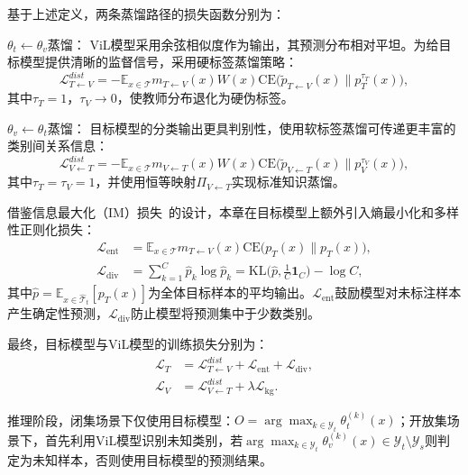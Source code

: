 基于上述定义，两条蒸馏路径的损失函数分别为：

$\theta_t\leftarrow\theta_v$蒸馏： ViL模型采用余弦相似度作为输出，其预测分布相对平坦。为给目标模型提供清晰的监督信号，采用硬标签蒸馏策略：
\begin{equation}
\mathcal{L}_{T\leftarrow V}^{dist} = -\mathbb{E}_{x\in\mathcal{T}}m_{T\leftarrow V}(x)W(x)\mathrm{CE}\big(\tilde{p}_{T\leftarrow V}(x) \| p_T^{\tau_T}(x)\big),
\label{eq:dist_t_from_v}
\end{equation}
其中$\tau_T=1$，$\tau_V\to 0$，使教师分布退化为硬伪标签。

$\theta_v\leftarrow\theta_t$蒸馏： 目标模型的分类输出更具判别性，使用软标签蒸馏可传递更丰富的类别间关系信息：
\begin{equation}
\mathcal{L}_{V\leftarrow T}^{dist} = -\mathbb{E}_{x\in\mathcal{T}}m_{V\leftarrow T}(x)W(x)\mathrm{CE}\big(\tilde{p}_{V\leftarrow T}(x) \| p_V^{\tau_V}(x)\big),
\label{eq:dist_v_from_t}
\end{equation}
其中$\tau_T=\tau_V=1$，并使用恒等映射$\Pi_{V\leftarrow T}$实现标准知识蒸馏。

借鉴信息最大化（IM）损失~\cite{liang2021source}的设计，本章在目标模型上额外引入熵最小化和多样性正则化损失：
\begin{align}
\mathcal{L}_{\text{ent}} & = \mathbb{E}_{x\in\mathcal{T}}m_{T\leftarrow V}(x)\mathrm{CE}\big(p_T(x) \| p_T(x)\big), 
\label{eq:loss_ent}\\
\mathcal{L}_{\text{div}} & = \sum_{k=1}^{C}\hat{p}_k\log\hat{p}_k = \mathrm{KL}\big(\hat{p},\tfrac{1}{C}\mathbf{1}_C\big) - \log C, 
\label{eq:loss_div}
\end{align}
其中$\hat{p}=\mathbb{E}_{x\in\hat{\mathcal{T}}_t}[p_T(x)]$为全体目标样本的平均输出。$\mathcal{L}_{\text{ent}}$鼓励模型对未标注样本产生确定性预测，$\mathcal{L}_{\text{div}}$防止模型将预测集中于少数类别。

最终，目标模型与ViL模型的训练损失分别为：
\begin{align}
\mathcal{L}_T &= \mathcal{L}_{T\leftarrow V}^{dist} + \mathcal{L}_{\text{ent}} + \mathcal{L}_{\text{div}},
\label{eq:loss_T}\\
\mathcal{L}_V &= \mathcal{L}_{V\leftarrow T}^{dist} + \lambda \mathcal{L}_{\text{kg}}.
\label{eq:loss_V}
\end{align}

推理阶段，闭集场景下仅使用目标模型：$O=\arg\max_{k\in\mathcal{Y}_t}\theta_t^{(k)}(x)$；开放集场景下，首先利用ViL模型识别未知类别，若$\arg\max_{k\in\mathcal{Y}_t}\theta_v^{(k)}(x)\in\mathcal{Y}_t\setminus\mathcal{Y}_s$则判定为未知样本，否则使用目标模型的预测结果。


